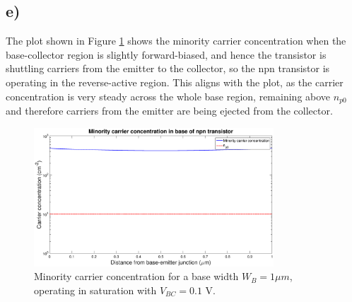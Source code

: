 \subsection*{e)}
	The plot shown in Figure \ref{fig::3e} shows the minority carrier concentration when the base-collector region is slightly forward-biased, and hence the transistor is shuttling carriers from the emitter to the collector, so the npn transistor is operating in the reverse-active region. This aligns with the plot, as the carrier concentration is very steady across the whole base region, remaining above $n_{p0}$ and therefore carriers from the emitter are being ejected from the collector.
	\begin{figure}[htbp!]
		\centering
		\includegraphics[width=0.8\textwidth]{./img/3e}
		\caption{Minority carrier concentration for a base width $W_B = 1 \mu m$, operating in saturation with $V_{BC} = 0.1 \textrm{ V}$.}
		\label{fig::3e}
	\end{figure}